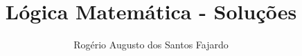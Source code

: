 \documentclass[portuguese,12pt,a4paper]{book}
\begin{document}
\title{Lógica Matemática - Soluções}
\author{Rogério Augusto dos Santos Fajardo}

\maketitle
\tableofcontents



\printbibliography[title=Referências]
\end{document}
